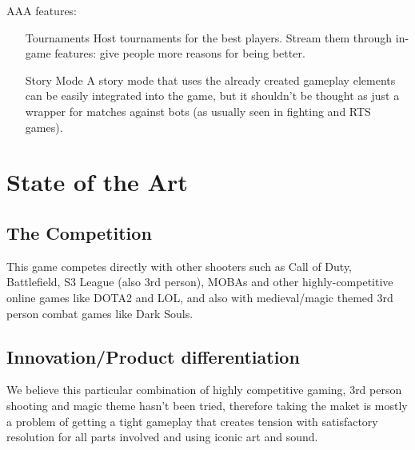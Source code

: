 \documentclass[12pt]{article}
\begin{document}
AAA features:

\begin{enumerate}
	\item[Tournaments] Host tournaments for the best players. Stream them through in-game features: give people more reasons for being better.
	\item[Story Mode] A story mode that uses the already created gameplay elements can be easily integrated into the game, but it shouldn't be thought as just a wrapper for matches against bots (as usually seen in fighting and RTS games).
\end{enumerate}

\newpage
\section{State of the Art}
\subsection{The Competition}
This game competes directly with other shooters such as Call of Duty, Battlefield, S3 League (also 3rd person), MOBAs and other highly-competitive online games like DOTA2 and LOL, and also with medieval/magic themed 3rd person combat games like Dark Souls.

\subsection{Innovation/Product differentiation}
We believe this particular combination of highly competitive gaming, 3rd person shooting and magic theme hasn't been tried, therefore taking the maket is mostly a problem of getting a tight gameplay that creates tension with satisfactory resolution for all parts involved and using iconic art and sound.
\end{document}
